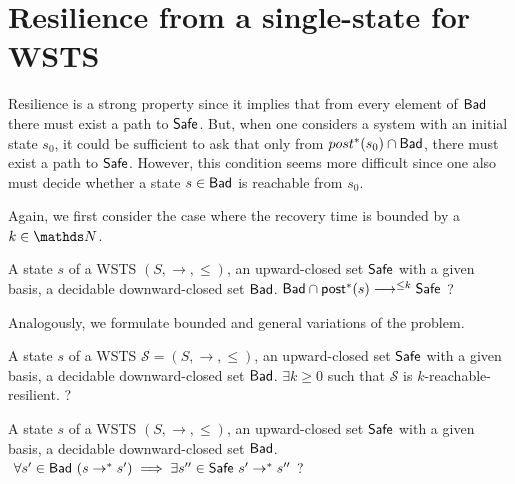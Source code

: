 



\section{Resilience from a single-state for WSTS}


Resilience is a strong property since it implies that from every element of $\textsf{Bad}$ there must exist a path to $\textsf{Safe}$. But, when one considers a system with an initial state $s_0$, it could be sufficient to ask that only from $post^*(s_0) \cap \textsf{Bad}$, there must exist a path to $\textsf{Safe}$. However, this condition seems more difficult since one also must decide whether a state $s \in \textsf{Bad}$ is reachable from $s_0$.
%
%

Again, we first consider the case where the recovery time is bounded by a $k \in \N$.

{A state $s$ of a WSTS $(S,\rightarrow, \leq)$, an upward-closed set $\textsf{Safe}$ with a given basis, a decidable downward-closed set $\textsf{Bad}$.}
{ $\textsf{Bad} \cap \textsf{post}^*(s) \longrightarrow^{\leq k} \textsf{Safe}$ ?  \newline}
%

Analogously, we formulate bounded and general variations of the problem.

{A state $s$ of a WSTS $\mathscr{S}=(S,\rightarrow, \leq)$, an upward-closed set $\textsf{Safe}$ with a given basis, a decidable downward-closed set $\textsf{Bad}$.}
{$\exists k \geq 0$ such that $\mathscr{S}$ is $k$-reachable-resilient. ?\newline}

{A state $s$ of a WSTS $(S,\rightarrow, \leq)$, an upward-closed set $\textsf{Safe}$ with a given basis, a decidable downward-closed set $\textsf{Bad}$.}
{$ ~ \forall s' \in \textsf{Bad} ~ (s \rightarrow^* s') \implies \exists s'' \in \textsf{Safe} ~ s' \rightarrow^{*} s''$ ?\newline}


